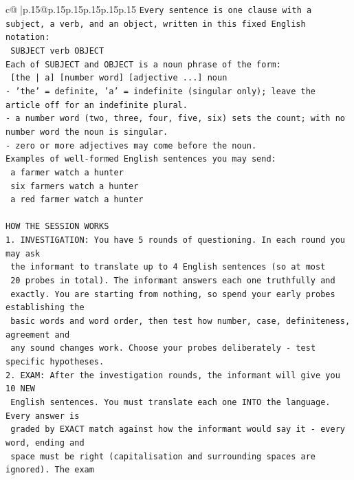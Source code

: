 \documentclass{article}
\begin{document}
{\begin{supertabular}{c@{$\;$}|p{.15\linewidth}@{}p{.15\linewidth}p{.15\linewidth}p{.15\linewidth}p{.15\linewidth}p{.15\linewidth}}
{{{\texttt{Every sentence is one clause with a subject, a verb, and an object, written in this fixed English notation:} \\
\texttt{    SUBJECT  verb  OBJECT} \\
\texttt{Each of SUBJECT and OBJECT is a noun phrase of the form:} \\
\texttt{    {[}the | a{]}  {[}number word{]}  {[}adjective ...{]}  noun} \\
\texttt{{-} 'the' = definite, 'a' = indefinite (singular only); leave the article off for an indefinite plural.} \\
\texttt{{-} a number word (two, three, four, five, six) sets the count; with no number word the noun is singular.} \\
\texttt{{-} zero or more adjectives may come before the noun.} \\
\texttt{Examples of well{-}formed English sentences you may send:} \\
\texttt{    a farmer watch a hunter} \\
\texttt{    six farmers watch a hunter} \\
\texttt{    a red farmer watch a hunter} \\
\\ 
\texttt{HOW THE SESSION WORKS} \\
\texttt{1. INVESTIGATION: You have 5 rounds of questioning. In each round you may ask} \\
\texttt{   the informant to translate up to 4 English sentences (so at most} \\
\texttt{   20 probes in total). The informant answers each one truthfully and} \\
\texttt{   exactly. You are starting from nothing, so spend your early probes establishing the} \\
\texttt{   basic words and word order, then test how number, case, definiteness, agreement and} \\
\texttt{   any sound changes work. Choose your probes deliberately {-} test specific hypotheses.} \\
\texttt{2. EXAM: After the investigation rounds, the informant will give you 10 NEW} \\
\texttt{   English sentences. You must translate each one INTO the language. Every answer is} \\
\texttt{   graded by EXACT match against how the informant would say it {-} every word, ending and} \\
\texttt{   space must be right (capitalisation and surrounding spaces are ignored). The exam} \\
}}}
\end{supertabular}}
\end{document}
